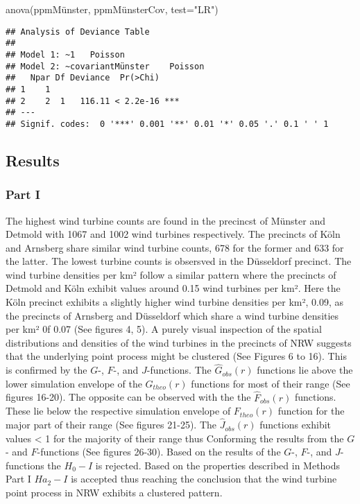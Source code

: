 \documentclass[
]{article}
\newenvironment{Shaded}{\begin{snugshade}}{\end{snugshade}}
\newcommand{\AttributeTok}[1]{\textcolor[rgb]{0.77,0.63,0.00}{#1}}
\newcommand{\FunctionTok}[1]{\textcolor[rgb]{0.00,0.00,0.00}{#1}}
\newcommand{\NormalTok}[1]{#1}
\newcommand{\StringTok}[1]{\textcolor[rgb]{0.31,0.60,0.02}{#1}}
\begin{document}
\begin{Shaded}
\begin{Highlighting}[]
\FunctionTok{anova}\NormalTok{(ppmMünster, ppmMünsterCov, }\AttributeTok{test=}\StringTok{"LR"}\NormalTok{)}
\end{Highlighting}
\end{Shaded}

\begin{verbatim}
## Analysis of Deviance Table
## 
## Model 1: ~1   Poisson
## Model 2: ~covariantMünster    Poisson
##   Npar Df Deviance  Pr(>Chi)    
## 1    1                          
## 2    2  1   116.11 < 2.2e-16 ***
## ---
## Signif. codes:  0 '***' 0.001 '**' 0.01 '*' 0.05 '.' 0.1 ' ' 1
\end{verbatim}

\hypertarget{results}{%
\subsection{Results}\label{results}}

\hypertarget{part-i}{%
\subsubsection{Part I}\label{part-i}}

The highest wind turbine counts are found in the precincst of Münster
and Detmold with 1067 and 1002 wind turbines respectively. The precincts
of Köln and Arnsberg share similar wind turbine counts, 678 for the
former and 633 for the latter. The lowest turbine counts is obsersved in
the Düsseldorf precinct. The wind turbine densities per km² follow a
similar pattern where the precincts of Detmold and Köln exhibit values
around 0.15 wind turbines per km². Here the Köln precinct exhibits a
slightly higher wind turbine densities per km², 0.09, as the precincts
of Arnsberg and Düsseldorf which share a wind turbine densities per km²
0f 0.07 (See figures 4, 5). A purely visual inspection of the spatial
distributions and densities of the wind turbines in the precincts of NRW
suggests that the underlying point process might be clustered (See
Figures 6 to 16). This is confirmed by the \(G\)-, \(F\)-, and
\(J\)-functions. The \(\hat{G}_{obs}(r)\) functions lie above the lower
simulation envelope of the \({G}_{theo}(r)\) functions for most of their
range (See figures 16-20). The opposite can be observed with the the
\(\hat{F}_{obs}(r)\) functions. These lie below the respective
simulation envelope of \({F}_{theo}(r)\) function for the major part of
their range (See figures 21-25). The \(\hat{J}_{obs}(r)\) functions
exhibit values \textless{} 1 for the majority of their range thus
Conforming the results from the \(G\)- and \(F\)-functions (See figures
26-30). Based on the results of the \(G\)-, \(F\)-, and \(J\)-functions
the \(H_{0} - I\) is rejected. Based on the properties described in
Methods Part I \(Ha_{2} - I\) is accepted thus reaching the conclusion
that the wind turbine point process in NRW exhibits a clustered pattern.
\end{document}
